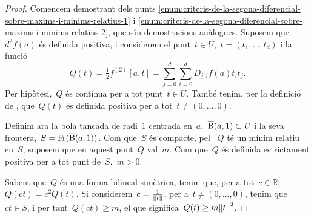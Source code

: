 \documentclass[../calcul-en-diverses-variables.tex]{subfiles}
\begin{document}
    \begin{proof}
        Comencem demostrant dels punts \eqref{enum:criteris-de-la-segona-diferencial-sobre-maxims-i-minims-relatius-1} i \eqref{enum:criteris-de-la-segona-diferencial-sobre-maxims-i-minims-relatius-2}, que són demostracions anàlogues.
        Suposem que~\(d^{2}f(a)\) és definida positiva, i considerem el punt~\(t\in U\),~\(t=(t_{1},\dots,t_{d})\) i la funció
        \[
            Q(t)=\tfrac{1}{2}f^{(2)}[a,t]=\sum_{j=0}^{d}\sum_{i=0}^{d}D_{j,i}f(a)t_{i}t_{j}.
        \]
        Per hipòtesi,~\(Q\) és contínua per a tot punt~\(t\in U\).
        També tenim, per la definició de , que~\(Q(t)\) és definida positiva per a tot~\(t\neq(0,\dots,0)\).

        Definim ara la bola tancada de radi~\(1\) centrada en~\(a\),~\(\overline{\operatorname{B}}(a,1)\subset U\) i la seva frontera,~\(S=\operatorname{Fr}(\overline{\operatorname{B}}(a,1))\).
        Com que~\(S\) és compacte, pel  ~\(Q\) té un mínim relatiu en~\(S\), suposem que en aquest punt~\(Q\) val~\(m\).
        Com que~\(Q\) és definida estrictament positiva per a tot punt de~\(S\),~\(m>0\).

        Sabent que~\(Q\) és una forma bilineal simètrica, tenim que, per a tot~\(c\in\mathbb{R}\),~\(Q(ct)=c^{2}Q(t)\).
        Si considerem~\(c=\frac{1}{\norm{t}}\), per a~\(t\neq(0,\dots,0)\), tenim que~\(ct\in S\), i per tant~\(Q(ct)\geq m\), el que significa~\(Q(t)\geq m\norm{t} ^{2}\).


\end{proof}
\end{document}
